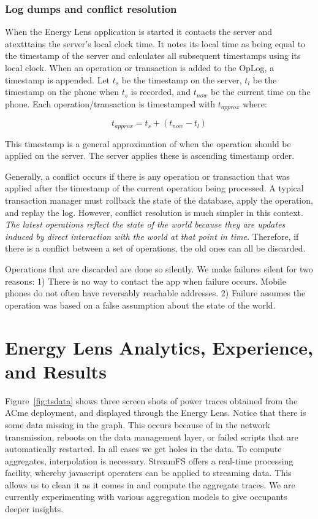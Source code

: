 \subsubsection{Log dumps and conflict resolution}
\label{sec:conflicts}
When the Energy Lens application is started it contacts the server and atextttains the server's local clock time. 
It notes its local time as being equal to the timestamp of the server and calculates all subsequent timestamps
using its local clock.  When an operation or transaction is added to the OpLog, a timestamp is appended.  Let $t_s$ be the timestamp 
on the server, $t_l$ be the timestamp on the phone when $t_s$ is recorded, and $t_{now}$ be the current time on the phone.  
Each operation/transaction is timestamped with $t_{approx}$ where:

\begin{equation}
t_{approx} = t_s + (t_{now} - t_l)
\end{equation}

This timestamp is a general approximation of when the operation should be applied on the server.  The server applies 
these is ascending timestamp order.

Generally, a conflict occurs if there is any operation or transaction that was applied after the timestamp of the current operation
being processed.  A typical transaction manager must rollback the state of the database, apply the operation, and replay
the log.  However, conflict resolution is much simpler in this context.  \emph{The latest operations reflect the state of the
world because they are updates induced by direct interaction with the world at that point in time.}  Therefore, if there is a conflict
between a set of operations, the old ones can all be discarded.

Operations that are discarded are done so silently.  We make failures silent for two reasons: 1) There is no way to contact the app when 
failure occurs.  Mobile phones
do not often have reversably reachable addresses.  2) Failure assumes the operation was based on a false assumption about the state
of the world.  


\section{Energy Lens Analytics, Experience, and Results}

Figure~\ref{fig:tsdata} shows three screen shots of power traces obtained from the ACme deployment, and displayed
through the Energy Lens.  Notice that there is
some data missing in the graph.  This occurs because of in the network transmission, reboots on the data management layer,
or failed scripts that are automatically restarted.  In all cases we get holes in the data.  To compute aggregates, interpolation 
is necessary.  StreamFS offers a real-time processing facility, whereby javascript operaters can be applied
to streaming data.  This allows us to clean it as it comes in and compute the aggregate traces.  We are currently experimenting
with various aggregation models to give occupants deeper insights.  


